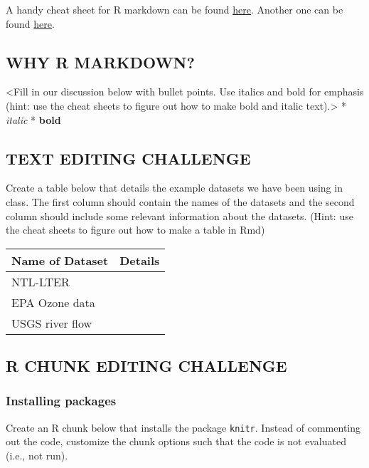\documentclass[
]{article}
\begin{document}
A handy cheat sheet for R markdown can be found
\href{https://www.rstudio.com/wp-content/uploads/2015/03/rmarkdown-reference.pdf}{here}.
Another one can be found
\href{https://www.rstudio.com/wp-content/uploads/2015/02/rmarkdown-cheatsheet.pdf}{here}.

\hypertarget{why-r-markdown}{%
\subsection{WHY R MARKDOWN?}\label{why-r-markdown}}

\textless Fill in our discussion below with bullet points. Use italics
and bold for emphasis (hint: use the cheat sheets to figure out how to
make bold and italic text).\textgreater{} * \emph{italic} *
\textbf{bold}

\hypertarget{text-editing-challenge}{%
\subsection{TEXT EDITING CHALLENGE}\label{text-editing-challenge}}

Create a table below that details the example datasets we have been
using in class. The first column should contain the names of the
datasets and the second column should include some relevant information
about the datasets. (Hint: use the cheat sheets to figure out how to
make a table in Rmd)

\begin{longtable}[]{@{}ll@{}}
\toprule
Name of Dataset & Details\tabularnewline
\midrule
\endhead
NTL-LTER &\tabularnewline
EPA Ozone data &\tabularnewline
USGS river flow &\tabularnewline
\bottomrule
\end{longtable}

\hypertarget{r-chunk-editing-challenge}{%
\subsection{R CHUNK EDITING CHALLENGE}\label{r-chunk-editing-challenge}}

\hypertarget{installing-packages}{%
\subsubsection{Installing packages}\label{installing-packages}}

Create an R chunk below that installs the package \texttt{knitr}.
Instead of commenting out the code, customize the chunk options such
that the code is not evaluated (i.e., not run).
\end{document}
